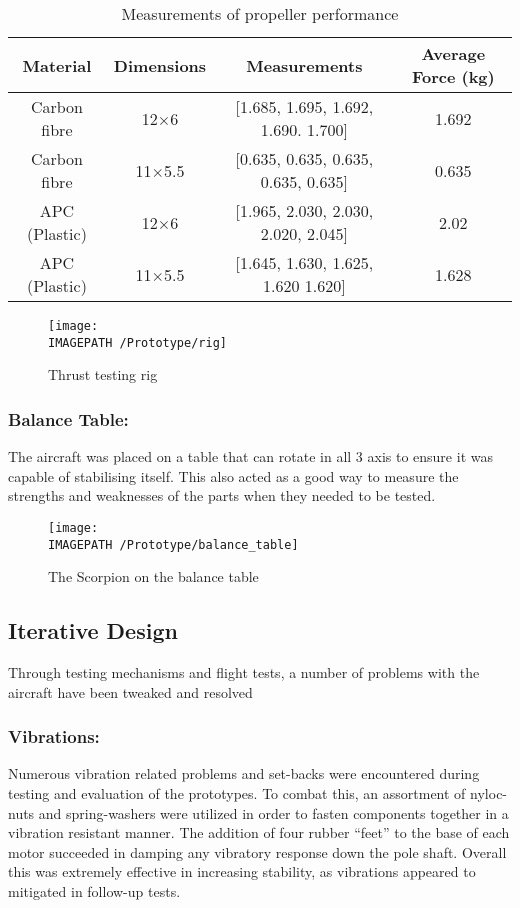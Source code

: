 \begin{table}[!htbp]
	\centering
	\caption{Measurements of propeller performance}
	\begin{tabular}{|c|c|c|c|}
		\hline Material & Dimensions & Measurements & Average Force (kg) \\ 
		\hline Carbon fibre & 12$\times$6 & [1.685, 1.695, 1.692, 1.690. 1.700] & 1.692 \\ 
		\hline Carbon fibre & 11$\times$5.5 & [0.635, 0.635, 0.635, 0.635, 0.635] & 0.635 \\ 
		\hline APC (Plastic) & 12$\times$6 & [1.965, 2.030, 2.030, 2.020, 2.045] & 2.02 \\ 
		\hline APC (Plastic) & 11$\times$5.5 & [1.645, 1.630, 1.625, 1.620 1.620] & 1.628 \\ 
		\hline 
	\end{tabular} 
	\label{tab:props}
\end{table}

\begin{figure}[!ht]
	\centering
	\texttt{[image: \\IMAGEPATH /Prototype/rig]}
	\caption{Thrust testing rig}
	\label{fig:rig}
\end{figure}



\subsubsection*{Balance Table:} The aircraft was placed on a table that can rotate in all 3 axis to ensure it was capable of stabilising itself. This also acted as a good way to measure the strengths and weaknesses of the parts when they needed to be tested. 

\begin{figure}[!ht]
	\centering
	\texttt{[image: \\IMAGEPATH /Prototype/balance\_table]}
	\caption{The Scorpion on the balance table}
	\label{fig:balance_table}
\end{figure}


\subsection{Iterative Design}
Through testing mechanisms and flight tests, a number of problems with the aircraft have been tweaked and resolved

\subsubsection*{Vibrations:} Numerous vibration related problems and set-backs were encountered during testing and evaluation of the prototypes. To combat this, an assortment of nyloc-nuts and spring-washers were utilized in order to fasten components together in a vibration resistant manner. The addition of four rubber ``feet'' to the base of each motor succeeded in damping any vibratory response down the pole shaft. Overall this was extremely effective in increasing stability, as vibrations appeared to mitigated in follow-up tests.

